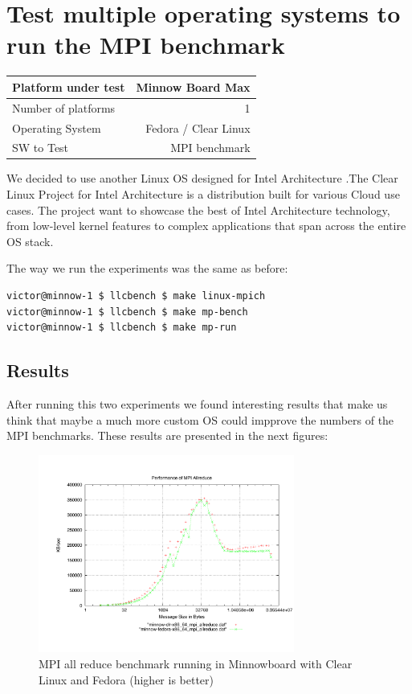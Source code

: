 \section{Test multiple operating systems to run the MPI benchmark}

    \begin{center}
    \begin{tabular}{ | l | r |}
        \hline
        Platform under test & Minnow Board  Max \\ \hline
        Number of platforms  & 1  \\ \hline
        Operating System & Fedora / Clear Linux  \\ \hline
        SW to Test & MPI benchmark \\ \hline
    \end{tabular}
    \end{center}


We decided to use another Linux OS designed for Intel Architecture
\cite{clear-linux}.The Clear Linux Project for Intel Architecture is a
distribution built for various Cloud use cases. The project  want to showcase
the best of Intel Architecture technology, from low-level kernel features to
complex applications that span across the entire OS stack.

The way we run the experiments was the same as before: 

\begin{lstlisting}[frame=single,language=bash]
victor@minnow-1 $ llcbench $ make linux-mpich
victor@minnow-1 $ llcbench $ make mp-bench
victor@minnow-1 $ llcbench $ make mp-run
\end{lstlisting}

\subsection{Results}

After running this two experiments we found interesting results that make us
think that maybe a much more custom OS could impprove the numbers of the MPI
benchmarks. These results are presented in the next figures:

\begin{figure}[H]
\centering
\includegraphics[width=0.75\textwidth]{images/mpbench_clr_experiments/mpi_allreduce.pdf}
\caption{MPI all reduce benchmark running in Minnowboard with Clear Linux and
Fedora (higher is better)}
\label{mpi_allreduce_clr_fedora}
\end{figure}

